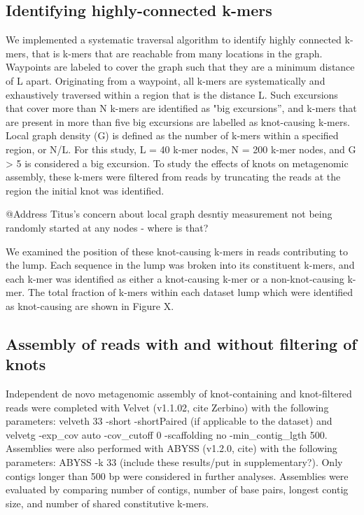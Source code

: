 \documentclass[11pt]{article} %
\begin{document}
\subsection{Identifying highly-connected k-mers}

We implemented a systematic traversal algorithm to identify highly connected k-mers, that is k-mers that are reachable from many locations in the graph. Waypoints are labeled to cover the graph such that they are a minimum distance of L apart. Originating from a waypoint, all k-mers are systematically and exhaustively traversed within a region that is the distance L. Such excursions that cover more than N k-mers are identified as "big excursions'', and k-mers that are present in more than five big excursions are labelled as knot-causing k-mers. Local graph density (G) is defined as the number of k-mers within a specified region, or N/L. For this study, L = 40 k-mer nodes, N = 200 k-mer nodes, and G > 5 is considered a big excursion. To study the effects of knots on metagenomic assembly, these k-mers were filtered from reads by truncating the reads at the region the initial knot was identified.

@Address Titus's concern about local graph desntiy measurement not being randomly started at any nodes - where is that?

We examined the position of these knot-causing k-mers in reads contributing to the lump. Each sequence in the lump was broken into its constituent k-mers, and each k-mer was identified as either a knot-causing k-mer or a non-knot-causing k-mer. The total fraction of k-mers within each dataset lump which were identified as knot-causing are shown in Figure X. 

\subsection{Assembly of reads with and without filtering of knots}
Independent de novo metagenomic assembly of knot-containing and knot-filtered reads
were completed with Velvet (v1.1.02, cite Zerbino) with the following
parameters: velveth 33 -short -shortPaired (if applicable to the dataset)
and velvetg -exp\_cov auto -cov\_cutoff 0 -scaffolding no -min\_contig\_lgth
500. Assemblies were also performed with ABYSS (v1.2.0, cite) with
the following parameters: ABYSS -k 33 (include these results/put in
supplementary?). Only contigs longer than 500 bp were considered in
further analyses. Assemblies were evaluated by comparing number of
contigs, number of base pairs, longest contig size, and number of
shared constitutive k-mers. 
\end{document}
